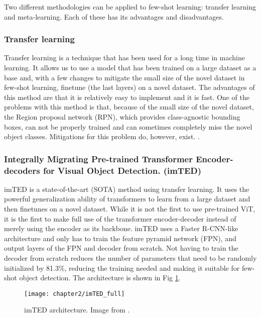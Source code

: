 Two different methodologies can be applied to few-shot learning: transfer learning and meta-learning. Each of these has its advantages and disadvantages. %

\subsubsection{Transfer learning}

Transfer learning is a technique that has been used for a long time in machine learning. It allows us to use a model that has been trained on a large dataset as a base and, with a few changes to mitigate the small size of the novel dataset in few-shot learning, finetune (the last layers) on a novel dataset. The advantages of this method are that it is relatively easy to implement and it is fast. One of the problems with this method is that, because of the small size of the novel dataset, the Region proposal network (RPN), which provides class-agnostic bounding boxes, can not be properly trained and can sometimes completely miss the novel object classes. Mitigations for this problem do, however, exist. \cite{DBLP:journals/corr/abs-2011-10142, VU2022104398, DBLP:journals/corr/abs-2105-09491, DBLP:journals/corr/abs-2103-05950,rs14143255}.

\subsubsection*{Integrally Migrating Pre-trained Transformer Encoder-decoders
for Visual Object Detection. (imTED) \citet{imTED}}

imTED is a state-of-the-art (SOTA) method using transfer learning. It uses the powerful generalization ability of transformers to learn from a large dataset and then finetunes on a novel dataset. While it is not the first to use pre-trained ViT, it is the first to make full use of the transformer encoder-decoder instead of merely using the encoder as its backbone. imTED uses a Faster R-CNN-like architecture and only has to train the feature pyramid network (FPN), and output layers of the FPN and decoder from scratch. Not having to train the decoder from scratch reduces the number of parameters that need to be randomly initialized by 81.3\%, reducing the training needed and making it suitable for few-shot object detection. The architecture is shown in Fig \ref{fig:2_imTED_full}.

\begin{figure}[h]
	\centering
	\texttt{[image: chapter2/imTED\_full]}
	\caption{\label{fig:2_imTED_full} imTED architecture. Image from \citet{imTED}.}
\end{figure}


